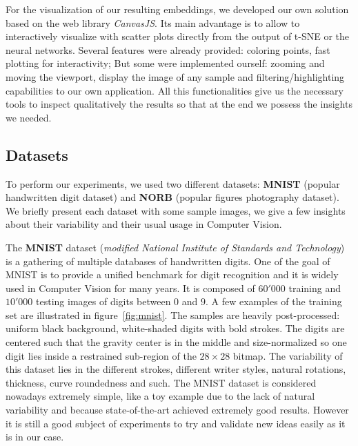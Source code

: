 \documentclass[a4paper,12pt]{report}
\begin{document}
For the visualization of our resulting embeddings, we developed our own solution based on the web library {\em CanvasJS}.
Its main advantage is to allow to interactively visualize with scatter plots directly from the output of t-SNE or the neural networks.
Several features were already provided: coloring points, fast plotting for interactivity; But some were implemented ourself: zooming and moving the viewport, display the image of any sample and filtering/highlighting capabilities to our own application.
All this functionalities give us the necessary tools to inspect qualitatively the results so that at the end we possess the insights we needed.

\subsection{Datasets}
To perform our experiments, we used two different datasets: {\bf MNIST}\cite{lecun1998mnist} (popular handwritten digit dataset) and {\bf NORB}\cite{lecun2004learning} (popular figures photography dataset).
We briefly present each dataset with some sample images, we give a few insights about their variability and their usual usage in Computer Vision.

The {\bf MNIST} dataset ({\em modified National Institute of Standards and Technology}) is a gathering of multiple databases of handwritten digits.
One of the goal of MNIST is to provide a unified benchmark for digit recognition and it is widely used in Computer Vision for many years.
It is composed of $60'000$ training and $10'000$ testing images of digits between $0$ and $9$.
A few examples of the training set are illustrated in figure~\ref{fig:mnist}.
The samples are heavily post-processed: uniform black background, white-shaded digits with bold strokes.
The digits are centered such that the gravity center is in the middle and size-normalized so one digit lies inside a restrained sub-region of the $28 \times 28$ bitmap.
The variability of this dataset lies in the different strokes, different writer styles, natural rotations, thickness, curve roundedness and such.
The MNIST dataset is considered nowadays extremely simple, like a toy example due to the lack of natural variability and because state-of-the-art achieved extremely good results.
However it is still a good subject of experiments to try and validate new ideas easily as it is in our case.
\end{document}
